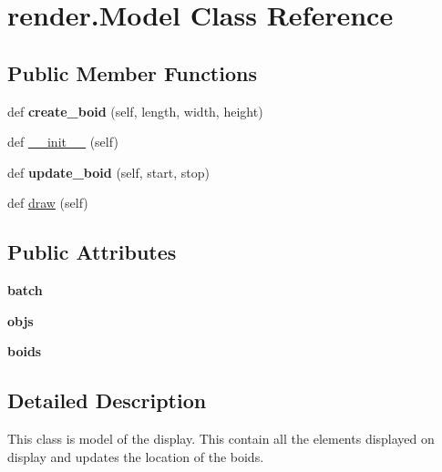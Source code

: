 \hypertarget{classrender_1_1Model}{}\section{render.\+Model Class Reference}
\label{classrender_1_1Model}
\subsection*{Public Member Functions}
\begin{DoxyCompactItemize}
\item 
\mbox{\label{classrender_1_1Model_ac6fa59097f82eacfe8f939733e753792}} 
def {\bfseries create\+\_\+boid} (self, length, width, height)
\item 
def \hyperlink{classrender_1_1Model_ad4cbfc4dcbc7cc1382a4c77029cf3f41}{\+\_\+\+\_\+init\+\_\+\+\_\+} (self)
\item 
\mbox{\label{classrender_1_1Model_a162db73ed47eae68019eeff2eaf15b42}} 
def {\bfseries update\+\_\+boid} (self, start, stop)
\item 
def \hyperlink{classrender_1_1Model_ab61e840a08a8de692fa36cf9eb6aaf81}{draw} (self)
\end{DoxyCompactItemize}
\subsection*{Public Attributes}
\begin{DoxyCompactItemize}
\item 
\mbox{\label{classrender_1_1Model_ae39a7732052568fa2230caea3a721eeb}} 
{\bfseries batch}
\item 
\mbox{\label{classrender_1_1Model_a3db963c6d7059062f8812ed2cf8cd8cc}} 
{\bfseries objs}
\item 
\mbox{\label{classrender_1_1Model_a35e92a5e080bbf2bd6076c989cc4998d}} 
{\bfseries boids}
\end{DoxyCompactItemize}


\subsection{Detailed Description}
\begin{DoxyVerb}This class is model of the display. This contain all the elements displayed on display and updates the location of the boids.\end{DoxyVerb}
 


